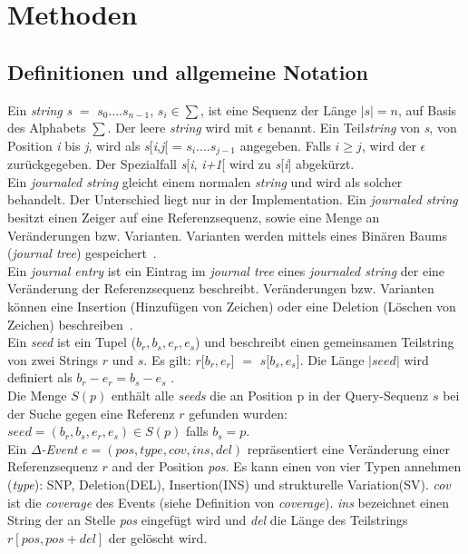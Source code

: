 \documentclass[12pt]{article}
\begin{document}
\section{Methoden}
\label{sec:methods}

\subsection{Definitionen und allgemeine Notation}
\label{sec:definitions}
Ein \emph{string} \textit{s} $=$ $s_{0}$....$s_{n-1}$, $ s_{i} \in \sum$, ist eine Sequenz der Länge $|s| = n$, auf Basis des Alphabets $\sum$. Der leere \emph{string} wird mit $\epsilon$ benannt. Ein Teil\emph{string} von \textit{s}, von Position \textit{i} bis \textit{j}, wird als \textit{s}[\textit{i},\textit{j}[ = $s_{i}$....$s_{j-1}$ angegeben. Falls $i\ge j$, wird der $\epsilon$ zurückgegeben. Der Spezialfall \textit{s}[\textit{i}, \textit{i+1}[ wird zu \textit{s}[\textit{i}] abgekürzt.  \\

Ein \emph{journaled string} gleicht einem normalen \emph{string} und wird als solcher behandelt. Der Unterschied liegt nur in der Implementation. Ein \emph{journaled string} besitzt einen Zeiger auf eine Referenzsequenz, sowie eine Menge an Veränderungen bzw. Varianten. Varianten werden mittels eines Binären Baums (\textit{journal tree}) gespeichert~\cite{Rahn15072014}.\\

Ein \emph{journal entry} ist ein Eintrag im \textit{journal tree} eines \textit{journaled string} der eine Veränderung der Referenzsequenz beschreibt. Veränderungen bzw. Varianten können eine Insertion (Hinzufügen von Zeichen) oder eine Deletion (Löschen von Zeichen) beschreiben~\cite{Rahn15072014}.\\

Ein \emph{seed} ist ein Tupel ($b_{r},b_{s},e_{r},e_{s}$) und beschreibt einen gemeinsamen Teilstring von zwei Strings $r$ und $s$. Es gilt: $r$[$b_{r},e_{r}$] $=$ $s$[$b_{s},e_{s}$]. Die Länge $|seed|$ wird definiert als $b_{r}-e_{r} = b_{s}-e_{s}$ .\\

Die Menge $S(p)$ enthält alle \emph{seeds} die an Position p in der Query-Sequenz $s$ bei der Suche gegen eine Referenz $r$ gefunden wurden: $ seed=(b_{r},b_{s},e_{r},e_{s}) \in S(p)$ falls $b_{s} = p $.\\

Ein \emph{$\Delta$-Event} $e = (pos,type,cov,ins,del)$ repräsentiert eine Veränderung einer Referenzsequenz $r$ and der Position \textit{pos}. Es kann einen von vier Typen annehmen (\textit{type}): SNP, Deletion(DEL), Insertion(INS) und strukturelle Variation(SV). \textit{cov} ist die \emph{coverage} des Events (siehe Definition von \emph{coverage}). \textit{ins} bezeichnet einen String der an Stelle \textit{pos} eingefügt wird und \textit{del} die Länge des Teilstrings $r[pos,pos+del]$ der gelöscht wird.\\
\end{document}
